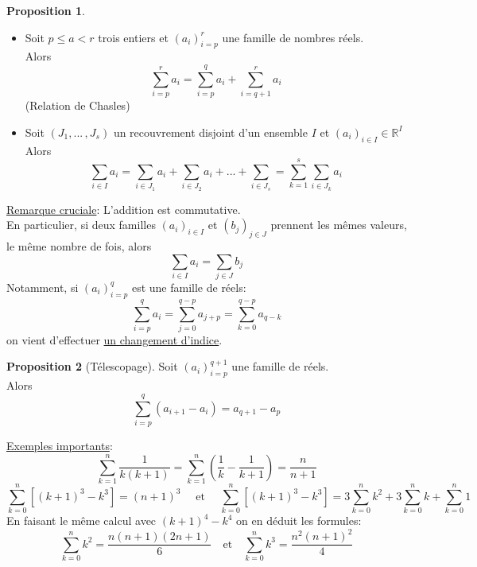 \documentclass[10pt,a4paper]{article}
\theoremstyle{definition}
\newtheorem{proposition}{Proposition}[section]
\begin{document}
\begin{proposition}
\hfill
\begin{itemize}
\item Soit $p \leq a < r$ trois entiers et $(a_i)_{i = p}^r$ une famille de nombres réels. \\
Alors
\[ \sum_{i = p}^r a_i = \sum_{i = p}^q a_i + \sum_{i = q + 1}^r a_i \]
(Relation de Chasles)
\item Soit $(J_1, ...\,, J_s)$ un recouvrement disjoint d'un ensemble $I$ et $(a_i)_{i \in I} \in \mathbb{R}^I$ \\
Alors
\[\sum_{i \in I} a_i = \sum_{i \in J_1} a_i + \sum_{ i \in J_2} a_i + ... + \sum_{i \in J_s} = \sum_{k = 1}^s \sum_{i \in J_k} a_i \]
\end{itemize}
\end{proposition}
\noindent \uline{Remarque cruciale}: L'addition est commutative. \\
En particulier, si deux familles $(a_i)_{i \in I}$ et $(b_j)_{j \in J}$ prennent les mêmes valeurs, le même nombre de fois, alors
\[ \sum_{i \in I} a_i = \sum_{j \in J} b_j \]
Notamment, si $(a_i)_{i = p}^q$ est une famille de réels:
\[ \sum_{i = p}^q a_i = \sum_{j = 0}^{q - p} a_{j + p} = \sum_{k = 0}^{q - p} a_{q - k} \]
on vient d'effectuer \uline{un changement d'indice}.
\begin{proposition}[Télescopage]
Soit $(a_i)_{i = p}^{q + 1}$ une famille de réels. \\
Alors
\[ \sum_{i = p}^q (a_{i + 1} - a_i) = a_{q + 1} - a_p \]
\end{proposition}
\noindent \uline{Exemples importants}:
\[ \sum_{k = 1}^n \frac{1}{k(k + 1)} = \sum_{k = 1}^n \left(\frac{1}{k} - \frac{1}{k + 1}\right) = \frac{n}{n + 1} \]
\[ \sum_{k = 0}^n [(k + 1)^3 - k^3] = (n + 1)^3 \quad \text{ et } \quad \sum_{k = 0}^n [(k + 1)^3 - k^3] = 3\sum_{k = 0}^n k^2 + 3\sum_{k = 0}^n k + \sum_{k = 0}^n 1 \]
En faisant le même calcul avec $(k + 1)^4 - k^4$ on en déduit les formules:
\[ \sum_{k = 0}^n k^2 = \frac{n(n+1)(2n + 1)}{6} \quad \text{et} \quad \sum_{k = 0}^n k^3 = \frac{n^2 (n + 1)^2}{4} \]
\end{document}
